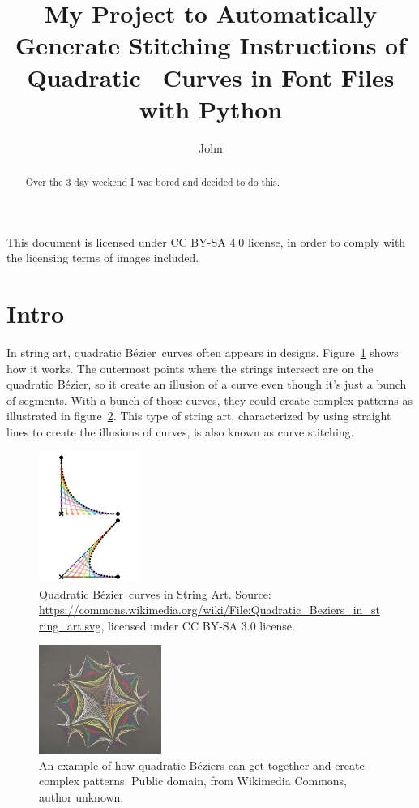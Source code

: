 \documentclass{article}
\title{My Project to Automatically Generate Stitching Instructions of Quadratic \bez\ Curves in Font Files with Python}
\author{John}
\newcommand{\bez}{B\'ezier}
\begin{document}
	\maketitle
	{\small This document is licensed under CC BY-SA 4.0 license, in order to comply with the licensing terms of images included.}
	\begin{abstract}
		Over the \(3\) day weekend I was bored and decided to do this.
	\end{abstract}
	
	\section{Intro}
	In string art, quadratic \bez\ curves often appears in designs. Figure~\ref{bezierwikm} shows how it works. The outermost points where the strings intersect are on the quadratic \bez, so it create an illusion of a curve even though it's just a bunch of segments. With a bunch of those curves, they could create complex patterns as illustrated in figure~\ref{actualstrart}. This type of string art, characterized by using straight lines to create the illusions of curves, is also known as curve stitching.
	\begin{figure}\centering
		\includegraphics[width=3.3cm]{Quadratic_Beziers_in_string_art.pdf}
		\caption{Quadratic \bez\ curves in String Art. Source: \url{https://commons.wikimedia.org/wiki/File:Quadratic_Beziers_in_string_art.svg}, licensed under CC BY-SA 3.0 license. \label{bezierwikm}}
	\end{figure}
	\begin{figure}\centering
		\includegraphics[width=4cm]{StringArt}
		\caption{An example of how quadratic \bez s can get together and create complex patterns. Public domain, from Wikimedia Commons, author unknown.\label{actualstrart}}
	\end{figure}
	
\end{document}

